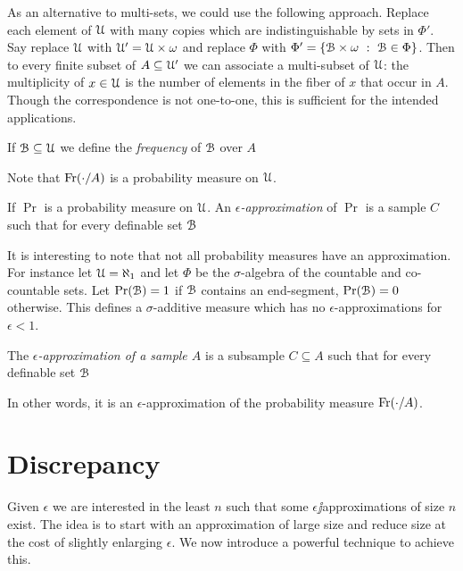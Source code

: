 \documentclass[sputnik.tex]{subfiles}
\begin{document}
As an alternative to multi-sets, we could use the following approach. Replace each element of $\EuScript U$ with many copies which are indistinguishable by sets in $\Phi'$. Say replace $\EuScript U$ with $\EuScript U'=\EuScript U\times\omega$ and replace $\Phi$ with $\Phi'=\{\B\times\omega\ :\ \B\in\Phi\}$. Then to every finite subset of $A\subseteq\EuScript U'$ we can associate a multi-subset of $\EuScript U$: the multiplicity of $x\in\EuScript U$ is the number of elements in the fiber of $x$ that occur in $A$.  Though the correspondence is not one-to-one, this is sufficient for the intended applications.


If $\EuScript B\subseteq\EuScript U$ we define the \emph{frequency\/} of $\EuScript B$ over $A$


Note that $\mathop{\rm Fr}(\cdot/A)$ is a probability measure on $\EuScript U$.

If $\Pr$ is a probability measure on $\EuScript U$. An \emph{$\epsilon$-approximation\/} of $\Pr$ is a sample $C$ such that for every definable set $\EuScript B$ 


It is interesting to note that not all probability measures have an approximation. For instance let $\EuScript U=\aleph_1$ and let $\Phi$ be the $\sigma$-algebra of the countable and co-countable sets. Let $\Pr(\EuScript B)=1$ if $\EuScript B$ contains an end-segment, $\Pr(\EuScript B)=0$ otherwise. This defines a $\sigma$-additive measure which has no $\epsilon$-approximations for $\epsilon<1$. 

The \emph{$\epsilon$-approximation of a sample $A$\/} is a subsample $C\subseteq A$ such that for every definable set $\EuScript B$


In other words, it is an $\epsilon$-approximation of the probability measure  $\mathop{\rm Fr}(\cdot/A)$.

\section{Discrepancy}\label{epsilon_approximations}

Given $\epsilon$ we are interested in the least $n$ such that some $\epsilon\jj$approximations of size $n$ exist.
The idea is to start with an approximation of large size and reduce size at the cost of slightly enlarging $\epsilon$.
We now introduce a powerful technique to achieve this.
\end{document}
